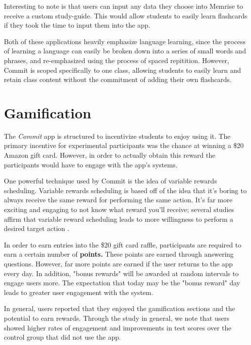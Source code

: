\par Interesting to note is that users can input any data they choose into Memrise to receive a custom study-guide. This would allow students to easily learn flashcards if they took the time to input them into the app.

\par Both of these applications heavily emphasize language learning, since the process of learning a language can easily be broken down into a series of small words and phrases, and re-emphasized using the process of spaced repitition. However, Commit is scoped specifically to one class, allowing students to easily learn and retain class content without the commitment of adding their own flashcards.

\section{Gamification}
\par The \textit{Commit} app is structured to incentivize students to enjoy using it. The primary incentive for experimental participants was the chance at winning a \$20 Amazon gift card. However, in order to actually obtain this reward the participants would have to engage with the app's systems.

\par One powerful technique used by Commit is the idea of variable rewards scheduling. Variable rewards scheduling is based off of the idea that it's boring to always receive the same reward for performing the same action. It's far more exciting and engaging to not know what reward you'll receive; several studies affirm that variable reward scheduling leads to more willingness to perform a desired target action \cite{dodin2001integrated}.

\par In order to earn entries into the \$20 gift card raffle, participants are required to earn a certain number of \textbf{points.} These points are earned through answering questions. However, far more points are earned if the user returns to the app every day. In addition, "bonus rewards" will be awarded at random intervals to engage users more. The expectation that today may be the "bonus reward" day leads to greater user engagement with the system.

\par In general, users reported that they enjoyed the gamification sections and the potential to earn rewards. Through the study in general, we note that users showed higher rates of engagement and improvements in test scores over the control group that did not use the app.